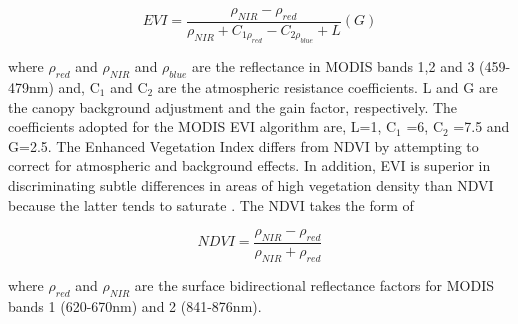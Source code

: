 \setlength{\belowdisplayskip}{0pt} \setlength{\belowdisplayshortskip}{0pt}
\setlength{\abovedisplayskip}{0pt} \setlength{\abovedisplayshortskip}{0pt}

\begin{center}
\begin{equation}
EVI = \frac{\rho_{NIR} - \rho_{red}}{\rho_{NIR} + C_{1\rho_{red}} - C_{2\rho_{blue}} + L} (G) \label{eq:2} 
\end{equation}
\end{center}

where $\rho_{red}$ and $\rho_{NIR}$ and $\rho_{blue}$ are the reflectance in MODIS bands 1,2 and 3 (459-479nm) and, C$_{1}$ and C$_{2}$ are the atmospheric resistance coefficients. L and G are the canopy background adjustment and the gain factor, respectively. The coefficients adopted for the MODIS EVI algorithm are, L=1, C$_{1}$ =6, C$_{2}$ =7.5 and G=2.5. The Enhanced Vegetation Index differs from NDVI by attempting to correct for atmospheric and background effects. In addition, EVI is superior in discriminating subtle differences in areas of high vegetation density than NDVI because the latter tends to saturate \citep{didan_munoz_2015, ratana_huete_ferreira_2005}. The NDVI takes the form of


\begin{center}
\begin{equation}
NDVI = \frac{\rho_{NIR} - \rho_{red}}{\rho_{NIR} + \rho_{red}} \label{eq:1} 
\end{equation}
\end{center}

where $\rho_{red}$ and $\rho_{NIR}$ are the surface bidirectional reflectance factors for MODIS bands 1 (620-670nm) and 2 (841-876nm). 


